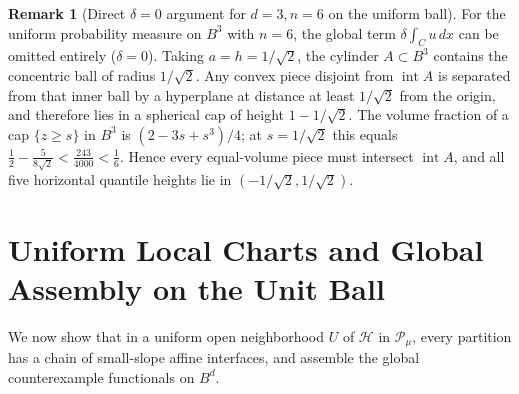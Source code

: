\documentclass[11pt,a4paper]{amsart}
\numberwithin{equation}{section}
\theoremstyle{definition}
\newtheorem{remark}[theorem]{Remark}
\newcommand{\Pcal}{\mathcal{P}}
\newcommand{\Hcal}{\mathcal{H}}
\newcommand{\inte}{\operatorname{int}}
\begin{document}
\begin{remark}[Direct $\delta = 0$ argument for $d = 3, n = 6$ on the uniform ball]
\label{rem:six-ball}
For the uniform probability measure on $B^3$ with $n = 6$, the global term $\delta \int_C u\,dx$ can be omitted entirely ($\delta = 0$). Taking $a = h = 1/\sqrt{2}$, the cylinder $A \subset B^3$ contains the concentric ball of radius $1/\sqrt{2}$. Any convex piece disjoint from $\inte A$ is separated from that inner ball by a hyperplane at distance at least $1/\sqrt{2}$ from the origin, and therefore lies in a spherical cap of height $1 - 1/\sqrt{2}$. The volume fraction of a cap $\{z \ge s\}$ in $B^3$ is $(2 - 3s + s^3)/4$; at $s = 1/\sqrt{2}$ this equals $\frac{1}{2} - \frac{5}{8\sqrt{2}} < \frac{243}{4000} < \frac{1}{6}$. Hence every equal-volume piece must intersect $\inte A$, and all five horizontal quantile heights lie in $(-1/\sqrt{2}, 1/\sqrt{2})$.
\end{remark}

\section{Uniform Local Charts and Global Assembly on the Unit Ball}
\label{sec:ball-assembly}

We now show that in a uniform open neighborhood $U$ of $\Hcal$ in $\Pcal_\mu$, every partition has a chain of small-slope affine interfaces, and assemble the global counterexample functionals on $B^d$.
\end{document}
